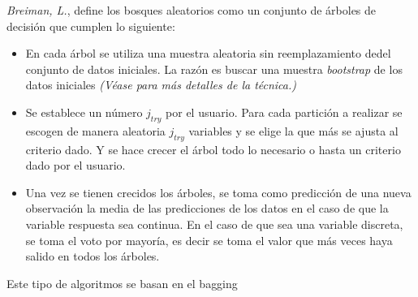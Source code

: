 \noindent \emph{Breiman, L.}\cite{Breiman 2004}, define los bosques aleatorios como un conjunto de árboles de decisión que cumplen lo siguiente:
\begin{itemize}
\item En cada árbol se utiliza una muestra aleatoria sin reemplazamiento dedel conjunto de datos iniciales. La razón es buscar una muestra \emph{bootstrap} de los datos iniciales \emph{(Véase \cite{Hesterberg 2011} para más detalles de la técnica.)}
\item Se establece un número $j_{try}$ por el usuario. Para cada partición a realizar se escogen de manera aleatoria $j_{try}$ variables y se elige la que más se ajusta al criterio dado. Y se hace crecer el árbol todo lo necesario o hasta un criterio dado por el usuario. 
 
\item Una vez se tienen crecidos los árboles, se toma como predicción de una nueva observación la media de las predicciones de los datos en el caso de que la variable respuesta sea continua. En el caso de que sea una variable discreta, se toma el voto por mayoría, es decir se toma el valor que más veces haya salido en todos los árboles. 
\end{itemize}

\noindent Este tipo de algoritmos se basan en el bagging \cite{Breiman 1996}
